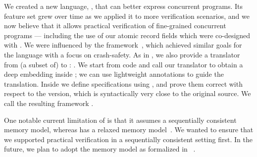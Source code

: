 We created a new \Iris language, \ZooLang, that can better express concurrent \OCaml programs.
Its feature set grew over time as we applied it to more verification scenarios, and we now believe that it allows practical verification of fine-grained concurrent \OCamlFive programs --- including the use of our atomic record fields which were co-designed with \ZooLang.
We were influenced by the \Perennial framework~\citep{DBLP:conf/sosp/ChajedTKZ19}, which achieved similar goals for the \Go language with a focus on crash-safety.
As in \Perennial, we also provide a translator from (a subset of) \OCaml to \ZooLang: \ocamlToZoo.
We start from \OCaml code and call our translator to obtain a deep \ZooLang embedding inside \Rocq; we can use lightweight annotations to guide the translation.
Inside \Rocq we define specifications using \Iris, and prove them correct with respect to the \ZooLang version, which is syntactically very close to the original \OCaml source.
We call the resulting framework \Zoo.

One notable current limitation of \ZooLang is that it assumes a sequentially consistent memory model, whereas \OCamlFive has a relaxed memory model~\citep{DBLP:conf/pldi/DolanSM18}.
We wanted to ensure that we supported practical verification in a sequentially consistent setting first.
In the future, we plan to adopt the \OCaml memory model as formalized in \Cosmo~\citep{DBLP:journals/pacmpl/MevelJP20}.


